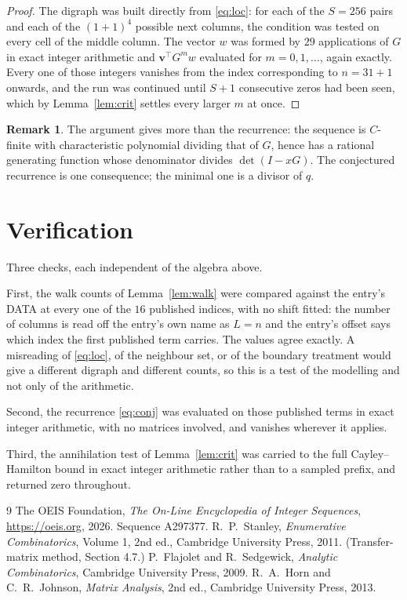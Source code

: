 \documentclass[11pt,a4paper]{article}
\theoremstyle{plain}
\theoremstyle{definition}
\newtheorem{remark}[theorem]{Remark}
\begin{document}
\begin{proof}
The digraph was built directly from \eqref{eq:loc}: for each of the $S=256$ pairs and each
of the $(1+1)^{4}$ possible next columns, the condition was tested on every cell of
the middle column. The vector $w$ was formed by $29$ applications of $G$ in exact integer
arithmetic and $\mathbf{v}^{\!\top}G^{m}w$ evaluated for $m=0,1,\dots$, again exactly.
Every one of those integers vanishes from the index corresponding to $n=31+1$ onwards,
and the run was continued until $S+1$ consecutive zeros had been seen, which by
Lemma~\ref{lem:crit} settles every larger $m$ at once.
\end{proof}

\begin{remark}
The argument gives more than the recurrence: the sequence is $C$-finite with characteristic
polynomial dividing that of $G$, hence has a rational generating function whose denominator
divides $\det(I-xG)$. The conjectured recurrence is one consequence; the minimal one is a
divisor of $q$.
\end{remark}

\section{Verification}

Three checks, each independent of the algebra above.

First, the walk counts of Lemma~\ref{lem:walk} were compared against the entry's DATA at
every one of the $16$ published indices, with no shift fitted: the number of columns is
read off the entry's own name as $L=n$ and the entry's offset says which index the first
published term carries. The values agree exactly. A misreading of \eqref{eq:loc}, of the
neighbour set, or of the boundary treatment would give a different digraph and different
counts, so this is a test of the modelling and not only of the arithmetic.

Second, the recurrence \eqref{eq:conj} was evaluated on those published terms in exact
integer arithmetic, with no matrices involved, and vanishes wherever it applies.

Third, the annihilation test of Lemma~\ref{lem:crit} was carried to the full
Cayley--Hamilton bound in exact integer arithmetic rather than to a sampled prefix, and
returned zero throughout.

\begin{thebibliography}{9}
 The OEIS Foundation, \emph{The On-Line Encyclopedia of Integer
Sequences}, \url{https://oeis.org}, 2026. Sequence A297377.
 R.~P.~Stanley, \emph{Enumerative Combinatorics}, Volume 1, 2nd ed.,
Cambridge University Press, 2011. (Transfer-matrix method, Section 4.7.)
 P.~Flajolet and R.~Sedgewick, \emph{Analytic Combinatorics}, Cambridge
University Press, 2009.
 R.~A.~Horn and C.~R.~Johnson, \emph{Matrix Analysis}, 2nd ed., Cambridge
University Press, 2013.
\end{thebibliography}
\end{document}

